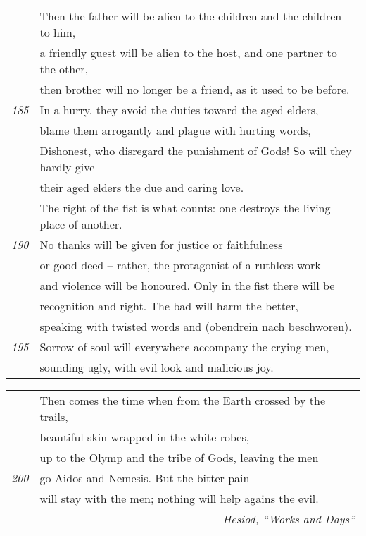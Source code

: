 \begin{tabular}[ht]{rl}
& Then the father will be alien to the children and the children to him, \\
& a friendly guest will be alien to the host, and one partner to the other, \\
& then brother will no longer be a friend, as it used to be before. \\
\footnotesize{\em 185}& In a hurry, they avoid the duties toward the aged elders, \\
& blame them arrogantly and plague with hurting words, \\
& Dishonest, who disregard the punishment of Gods! So will they hardly give \\
& their aged elders the due and caring love. \\
& The right of the fist is what counts: one destroys the living place of 
another. \\
\footnotesize{\em 190}& No thanks will be given for justice or faithfulness \\
& or good deed -- rather, the protagonist of a ruthless work \\
& and violence will be honoured. Only in the fist there will be \\
& recognition and right. The bad will harm the better, \\
& speaking with twisted words and (obendrein nach beschworen). \\
\footnotesize{\em 195}& Sorrow of soul will everywhere accompany the crying men, \\
& sounding ugly, with evil look and malicious joy. 
\end{tabular}

\begin{tabular}[ht]{rl}
& Then comes the time when from the Earth crossed by the trails, \\
& beautiful skin wrapped in the white robes, \\
& up to the Olymp and the tribe of Gods, leaving the men \\
\footnotesize{\em 200} & go Aidos and Nemesis. But the bitter pain \\
& will stay with the men; nothing will help agains the evil. \\[1.5ex]
\multicolumn{2}{r}{\em Hesiod, ``Works and Days''} \\[3ex]
\end{tabular}

